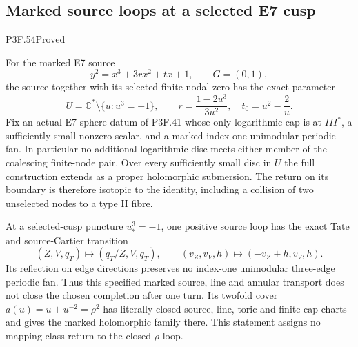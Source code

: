 \subsection{Marked source loops at a selected E7 cusp}
\begin{statement}{P3F.54}{Proved}

For the marked E7 source
\[
 y^2=x^3+3r x^2+t x+1,\qquad G=(0,1),
\]
the source together with its selected finite nodal zero has the exact
parameter
\[
 U=\mathbb C^*\setminus\{u:u^3=-1\},\qquad
 r=\frac{1-2u^3}{3u^2},\quad t_0=u^2-\frac2u .
\]
Fix an actual E7 sphere datum of P3F.41 whose only logarithmic cap
is at \(III^*\), a sufficiently small nonzero scalar, and a marked
index-one unimodular periodic fan. In particular no additional
logarithmic disc meets either member of the coalescing finite-node pair.
Over every sufficiently small disc in \(U\) the full construction
extends as a proper holomorphic submersion. The return on its boundary
is therefore isotopic to the identity, including a collision of two
unselected nodes to a type II fibre.

At a selected-cusp puncture \(u_*^3=-1\), one positive source loop has
the exact Tate and source-Cartier transition
\[
 (Z,V,q_T)\longmapsto(q_T/Z,V,q_T),\qquad
 (v_Z,v_V,h)\longmapsto(-v_Z+h,v_V,h).
\]
Its reflection on edge directions preserves no index-one unimodular
three-edge periodic fan. Thus this specified marked source, line and
annular transport does not close the chosen completion after one turn.
Its twofold cover \(a(u)=u+u^{-2}=\rho^2\) has literally closed source,
line, toric and finite-cap charts and gives the marked holomorphic
family there. This statement assigns no mapping-class return to the
closed \(\rho\)-loop.

\end{statement}
